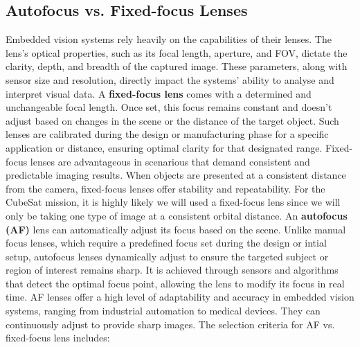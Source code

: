 \subsection{Autofocus vs. Fixed-focus Lenses}
Embedded vision systems rely heavily on the capabilities of their lenses. The lens's optical properties, such as its focal length, aperture, and FOV, dictate the clarity, depth, and breadth of the captured image. These parameters, along with sensor size and resolution, directly impact the systems' ability to analyse and interpret visual data.
\nl
A \textbf{fixed-focus lens} comes with a determined and unchangeable focal length. Once set, this focus remains constant and doesn't adjust based on changes in the scene or the distance of the target object. Such lenses are calibrated during the design or manufacturing phase for a specific application or distance, ensuring optimal clarity for that designated range.
Fixed-focus lenses are advantageous in scenarious that demand consistent and predictable imaging results. When objects are presented at a consistent distance from the camera, fixed-focus lenses offer stability and repeatability. For the CubeSat mission, it is highly likely we will used a fixed-focus lens since we will only be taking one type of image at a consistent orbital distance.
\nl
An \textbf{autofocus (AF)} lens can automatically adjust its focus based on the scene. Unlike manual focus lenses, which require a predefined focus set during the design or intial setup, autofocus lenses dynamically adjust to ensure the targeted subject or region of interest remains sharp. It is achieved through sensors and algorithms that detect the optimal focus point, allowing the lens to modify its focus in real time.
AF lenses offer a high level of adaptability and accuracy in embedded vision systems, ranging from industrial automation to medical devices. They can continuously adjust to provide sharp images.
\nl
The selection criteria for AF vs. fixed-focus lens includes:
